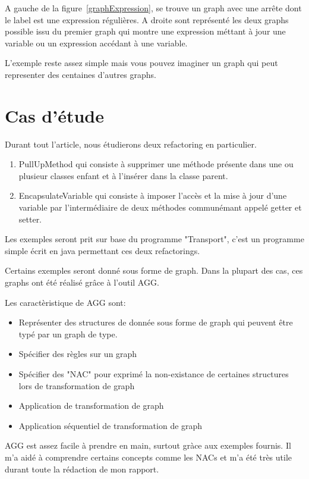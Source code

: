 \documentclass[a4paper, 12pt]{article}
\begin{document}
A gauche de la figure~\ref{graphExpression}, se trouve un graph avec une arrête dont le label est une expression régulières. A droite sont représenté les deux graphs possible issu du premier graph qui montre une expression méttant à jour une variable ou un expression accédant à une variable.

L'exemple reste assez simple mais vous pouvez imaginer un graph qui peut representer des centaines d'autres graphs.

\section{Cas d'étude}

Durant tout l'article, nous étudierons deux refactoring en particulier. 

\begin{enumerate}
\item PullUpMethod qui consiste à supprimer une méthode présente dans une ou plusieur classes enfant et à l'insérer dans la classe parent.
\item EncapsulateVariable qui consiste à imposer l'accès et la mise à jour d'une variable par l'intermédiaire de deux méthodes communémant appelé getter et setter.
\end{enumerate}

Les exemples seront prit sur base du programme "Transport", c'est un programme simple écrit en java permettant ces deux refactorings.

Certains exemples seront donné sous forme de graph. Dans la plupart des cas, ces graphs ont été réalisé grâce à l'outil AGG. 

Les caractèristique de AGG sont:

\begin{itemize}[label=\textbullet]
\item Représenter des structures de donnée sous forme de graph qui peuvent être typé par un graph de type.
\item Spécifier des règles sur un graph
\item Spécifier des "NAC" pour exprimé la non-existance de certaines structures lors de transformation de graph
\item Application de transformation de graph
\item Application séquentiel de transformation de graph
\end{itemize}

AGG est assez facile à prendre en main, surtout gràce aux exemples fournis. Il m'a aidé à comprendre certains concepts comme les NACs et m'a été très utile durant toute la rédaction de mon rapport.
\end{document}
